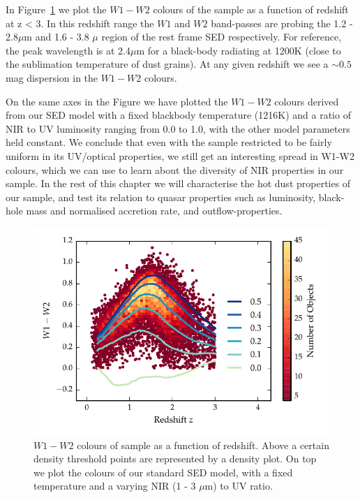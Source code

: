 In Figure~\ref{fig:w1w2colorsratio} we plot the $W1 - W2$ colours of the sample as a function of redshift at z < 3. 
In this redshift range the $W1$ and $W2$ band-passes are probing the 1.2 - 2.8$\mu$m and 1.6 - 3.8 $\mu$ region of the rest frame SED respectively. 
For reference, the peak wavelength is at 2.4$\mu$m for a black-body radiating at 1200K (close to the sublimation temperature of dust grains). 
At any given redshift we see a $\sim 0.5$ mag dispersion in the $W1-W2$ colours. 

On the same axes in the Figure we have plotted the $W1 - W2$ colours derived from our SED model with a fixed blackbody temperature (1216K) and a ratio of NIR to UV luminosity ranging from 0.0 to 1.0, with the other model parameters held constant. 
We conclude that even with the sample restricted to be fairly uniform in its UV/optical properties, we still get an interesting spread in W1-W2 colours, which we can use to learn about the diversity of NIR properties in our sample. 
In the rest of this chapter we will characterise the hot dust properties of our sample, and test its relation to quasar properties such as luminosity, black-hole mass and normalised accretion rate, and outflow-properties. 

\begin{figure}
\centering
\includegraphics[width=\columnwidth]{figures/chapter05/w1w2_versus_redshift_ratio.pdf}
\caption{$W1 - W2$ colours of sample as a function of redshift. Above a certain density threshold points are represented by a density plot. On top we plot the colours of our standard SED model, with a fixed temperature and a varying NIR (1 - 3 $\mu$m) to UV ratio.}
  \label{fig:w1w2colorsratio}
\end{figure}

